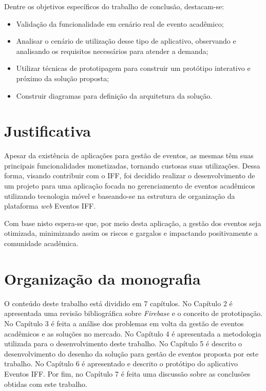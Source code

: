 Dentre os objetivos específicos do trabalho de conclusão, destacam-se:
\begin{itemize}
    \item Validação da funcionalidade em cenário real de evento acadêmico;
    \item Analisar o cenário de utilização desse tipo de aplicativo, observando e analisando os requisitos necessários para atender a demanda;
    \item Utilizar técnicas de prototipagem para construir um protótipo interativo e próximo da solução proposta;
    \item Construir diagramas para definição da arquitetura da solução. 
\end{itemize}

\section{Justificativa}

Apesar da existência de aplicações para gestão de eventos, as mesmas têm suas principais funcionalidades monetizadas, tornando custosas suas utilizações. Dessa forma, visando contribuir com o IFF, foi decidido realizar o desenvolvimento de um projeto para uma aplicação focada no gerenciamento de eventos acadêmicos utilizando tecnologia móvel e baseando-se na estrutura de organização da plataforma \textit{web} Eventos IFF.

Com base nisto espera-se que, por meio desta aplicação, a gestão dos eventos seja otimizada, minimizando assim os riscos e gargalos e impactando positivamente a comunidade acadêmica.

\section{Organização da monografia}

O conteúdo deste trabalho está dividido em 7 capítulos. No Capítulo 2 é apresentada uma revisão bibliográfica sobre \textit{Firebase} e o conceito de prototipação. No Capítulo 3 é feita a análise dos problemas em volta da gestão de eventos acadêmicos e as soluções no mercado. No Capítulo 4 é apresentada a metodologia utilizada para o desenvolvimento deste trabalho. No Capítulo 5 é descrito o desenvolvimento do desenho da solução para gestão de eventos proposta por este trabalho. No Capítulo 6 é apresentado e descrito o protótipo do aplicativo Eventos IFF. Por fim, no Capítulo 7 é feita uma discussão sobre as conclusões obtidas com este trabalho.
